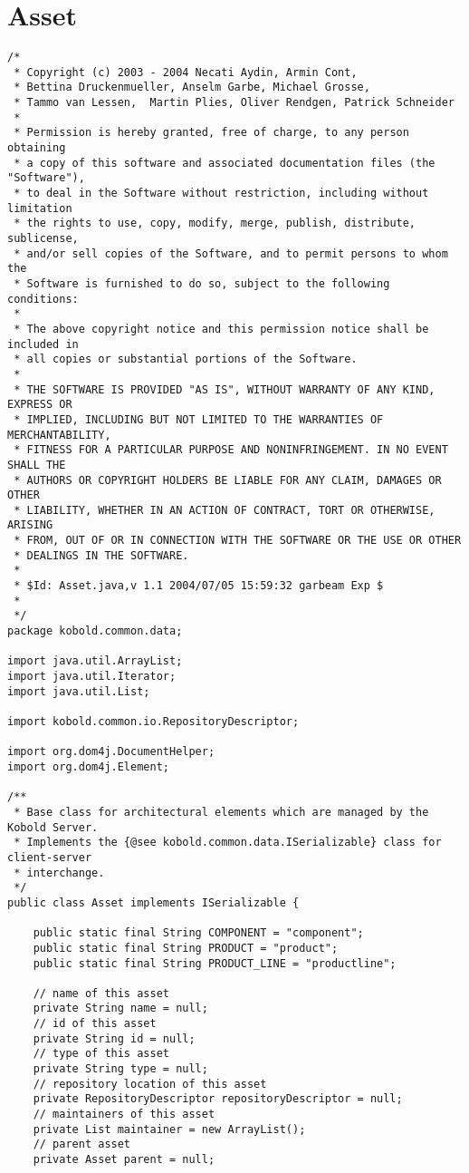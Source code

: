 \section{Asset}
\small \begin{verbatim}
/*
 * Copyright (c) 2003 - 2004 Necati Aydin, Armin Cont, 
 * Bettina Druckenmueller, Anselm Garbe, Michael Grosse, 
 * Tammo van Lessen,  Martin Plies, Oliver Rendgen, Patrick Schneider
 * 
 * Permission is hereby granted, free of charge, to any person obtaining
 * a copy of this software and associated documentation files (the "Software"),
 * to deal in the Software without restriction, including without limitation
 * the rights to use, copy, modify, merge, publish, distribute, sublicense, 
 * and/or sell copies of the Software, and to permit persons to whom the 
 * Software is furnished to do so, subject to the following conditions:
 *
 * The above copyright notice and this permission notice shall be included in 
 * all copies or substantial portions of the Software.
 *
 * THE SOFTWARE IS PROVIDED "AS IS", WITHOUT WARRANTY OF ANY KIND, EXPRESS OR 
 * IMPLIED, INCLUDING BUT NOT LIMITED TO THE WARRANTIES OF MERCHANTABILITY, 
 * FITNESS FOR A PARTICULAR PURPOSE AND NONINFRINGEMENT. IN NO EVENT SHALL THE 
 * AUTHORS OR COPYRIGHT HOLDERS BE LIABLE FOR ANY CLAIM, DAMAGES OR OTHER 
 * LIABILITY, WHETHER IN AN ACTION OF CONTRACT, TORT OR OTHERWISE, ARISING 
 * FROM, OUT OF OR IN CONNECTION WITH THE SOFTWARE OR THE USE OR OTHER 
 * DEALINGS IN THE SOFTWARE.
 *
 * $Id: Asset.java,v 1.1 2004/07/05 15:59:32 garbeam Exp $
 *
 */
package kobold.common.data;

import java.util.ArrayList;
import java.util.Iterator;
import java.util.List;

import kobold.common.io.RepositoryDescriptor;

import org.dom4j.DocumentHelper;
import org.dom4j.Element;

/**
 * Base class for architectural elements which are managed by the Kobold Server.
 * Implements the {@see kobold.common.data.ISerializable} class for client-server
 * interchange.
 */
public class Asset implements ISerializable {

	public static final String COMPONENT = "component";
	public static final String PRODUCT = "product";
	public static final String PRODUCT_LINE = "productline";
	
	// name of this asset
	private String name = null;
	// id of this asset
	private String id = null;
	// type of this asset
	private String type = null;
	// repository location of this asset
	private RepositoryDescriptor repositoryDescriptor = null;
	// maintainers of this asset
	private List maintainer = new ArrayList();
	// parent asset
	private Asset parent = null;
	

\end{verbatim}
